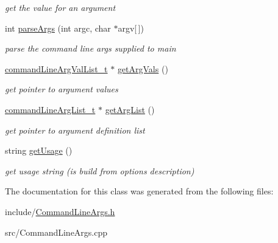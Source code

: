 \begin{DoxyCompactItemize}
\begin{DoxyCompactList}\small\item\em get the value for an argument \end{DoxyCompactList}\item 
\mbox{\label{classCommandLineArgs_a26e8d3a0e201d0c2808ef212a7a6e6f8}} 
int \hyperlink{classCommandLineArgs_a26e8d3a0e201d0c2808ef212a7a6e6f8}{parse\+Args} (int argc, char $\ast$argv\mbox{[}$\,$\mbox{]})
\begin{DoxyCompactList}\small\item\em parse the command line args supplied to main \end{DoxyCompactList}\item 
\mbox{\label{classCommandLineArgs_a2f9280db1c9b8cd7644537c111ee0787}} 
\hyperlink{CommandLineArgs_8h_a092e791e8505f700f627414f125dcd6e}{command\+Line\+Arg\+Val\+List\+\_\+t} $\ast$ \hyperlink{classCommandLineArgs_a2f9280db1c9b8cd7644537c111ee0787}{get\+Arg\+Vals} ()
\begin{DoxyCompactList}\small\item\em get pointer to argument values \end{DoxyCompactList}\item 
\mbox{\label{classCommandLineArgs_ad04d8c3fa544cd7f3a070a181675ae71}} 
\hyperlink{CommandLineArgs_8h_aaee5f0d903dd3ebb586b68e0cd4d5594}{command\+Line\+Arg\+List\+\_\+t} $\ast$ \hyperlink{classCommandLineArgs_ad04d8c3fa544cd7f3a070a181675ae71}{get\+Arg\+List} ()
\begin{DoxyCompactList}\small\item\em get pointer to argument definition list \end{DoxyCompactList}\item 
\mbox{\label{classCommandLineArgs_acb1dd9919009b2a61a9416efd9583d7f}} 
string \hyperlink{classCommandLineArgs_acb1dd9919009b2a61a9416efd9583d7f}{get\+Usage} ()
\begin{DoxyCompactList}\small\item\em get usage string (is build from options description) \end{DoxyCompactList}\end{DoxyCompactItemize}


The documentation for this class was generated from the following files\+:\begin{DoxyCompactItemize}
\item 
include/\hyperlink{CommandLineArgs_8h}{Command\+Line\+Args.\+h}\item 
src/Command\+Line\+Args.\+cpp\end{DoxyCompactItemize}
